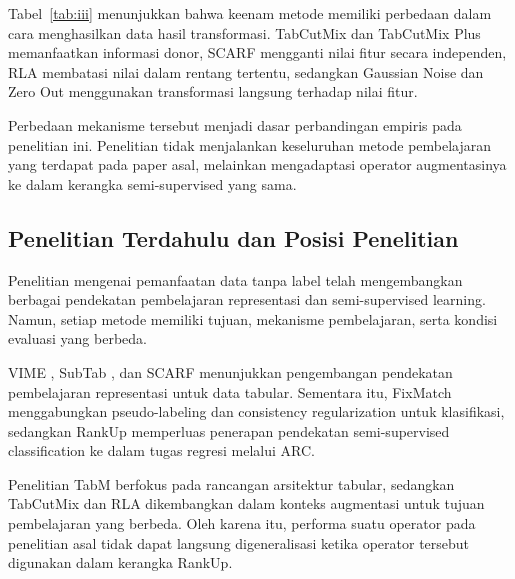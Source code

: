 Tabel~\ref{tab:iii} menunjukkan bahwa keenam metode memiliki perbedaan dalam cara menghasilkan data hasil transformasi. TabCutMix dan TabCutMix Plus memanfaatkan informasi donor, SCARF mengganti nilai fitur secara independen, RLA membatasi nilai dalam rentang tertentu, sedangkan Gaussian Noise dan Zero Out menggunakan transformasi langsung terhadap nilai fitur.

Perbedaan mekanisme tersebut menjadi dasar perbandingan empiris pada penelitian ini. Penelitian tidak menjalankan keseluruhan metode pembelajaran yang terdapat pada paper asal, melainkan mengadaptasi operator augmentasinya ke dalam kerangka semi-supervised yang sama.

\subsection{Penelitian Terdahulu dan Posisi Penelitian}

Penelitian mengenai pemanfaatan data tanpa label telah mengembangkan berbagai pendekatan pembelajaran representasi dan semi-supervised learning. Namun, setiap metode memiliki tujuan, mekanisme pembelajaran, serta kondisi evaluasi yang berbeda.

VIME \cite{ref5}, SubTab \cite{ref6}, dan SCARF \cite{ref7} menunjukkan pengembangan pendekatan pembelajaran representasi untuk data tabular. Sementara itu, FixMatch \cite{ref9} menggabungkan pseudo-labeling dan consistency regularization untuk klasifikasi, sedangkan RankUp \cite{ref10} memperluas penerapan pendekatan semi-supervised classification ke dalam tugas regresi melalui ARC.

Penelitian TabM \cite{ref11} berfokus pada rancangan arsitektur tabular, sedangkan TabCutMix \cite{ref12} dan RLA \cite{ref13} dikembangkan dalam konteks augmentasi untuk tujuan pembelajaran yang berbeda. Oleh karena itu, performa suatu operator pada penelitian asal tidak dapat langsung digeneralisasi ketika operator tersebut digunakan dalam kerangka RankUp.


